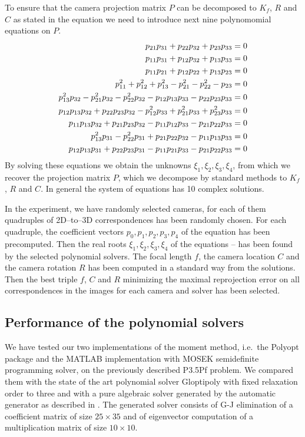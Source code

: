 To ensure that the camera projection matrix $P$ can be decomposed to $K_f$, $R$ and $C$ as stated in the equation  we need to introduce next nine polynomomial equations on $P$.
\begin{align}
  p_{21}p_{31} + p_{22}p_{32} + p_{23}p_{33} &= 0 \labeleq{app:P35Pf:eqs1}\\
  p_{11}p_{31} + p_{12}p_{32} + p_{13}p_{33} &= 0\\
  p_{11}p_{21} + p_{12}p_{22} + p_{13}p_{23} &= 0\\
  p_{11}^2 + p_{12}^2 + p_{13}^2 - p_{21}^2 - p_{22}^2 - p_{23} &= 0\\
  p_{13}^2p_{32} - p_{21}^2p_{32} - p_{22}^2p_{32} - p_{12}p_{13}p_{33} - p_{22}p_{23}p_{33} &= 0\\
  p_{12}p_{13}p_{32} + p_{22}p_{23}p_{32} - p_{12}^2p_{33} + p_{21}^2p_{33} + p_{23}^2p_{33} &= 0\\
  p_{11}p_{13}p_{32} + p_{21}p_{23}p_{32} - p_{11}p_{12}p_{33} - p_{21}p_{22}p_{33} &= 0\\
  p_{13}^2p_{31} - p_{22}^2p_{31} + p_{21}p_{22}p_{32} - p_{11}p_{13}p_{33} &= 0\\
  p_{12}p_{13}p_{31} + p_{22}p_{23}p_{31} - p_{11}p_{21}p_{33} - p_{21}p_{22}p_{33} &= 0 \labeleq{app:P35Pf:eqs9}
\end{align}
By solving these equations we obtain the unknowns $\xi_1, \xi_2, \xi_3, \xi_4$, from which we recover the projection matrix $P$, which we decompose by standard methods to $K_f$, $R$ and $C$.
In general the system of equations has 10 complex solutions.

In the experiment, we have randomly selected \importAppPPPfNumCameras{} cameras, for each of them \importAppPPPfNumPoints{} quadruples of 2D--to--3D correspondences has been randomly chosen.
For each quadruple, the coefficient vectors $p_0, p_1, p_2, p_3, p_4$ of the equation  has been precomputed.
Then the real roots $\xi_1, \xi_2, \xi_3, \xi_4$ of the equations  --  has been found by the selected polynomial solvers.
The focal length $f$, the camera location $C$ and the camera rotation $R$ has been computed in a standard way from the solutions.
Then the best triple $f$, $C$ and $R$ minimizing the maximal reprojection error on all correspondences in the images for each camera and solver has been selected.

\subsection{Performance of the polynomial solvers}
We have tested our two implementations of the moment method, i.e.\ the Polyopt package and the MATLAB implementation with MOSEK semidefinite programming solver, on the previously described P3.5Pf problem.
We compared them with the state of the art polynomial solver Gloptipoly with fixed relaxation order to three and with a pure algebraic solver generated by the automatic generator \cite{autogen} as described in \cite{P35Pf}.
The generated solver consists of G-J elimination of a coefficient matrix of size $25 \times 35$ and of eigenvector computation of a multiplication matrix of size $10 \times 10$.

